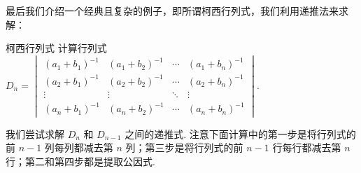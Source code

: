 最后我们介绍一个经典且复杂的例子，即所谓柯西行列式，我们利用递推法来求解：

\begin{example}{柯西行列式}{}
    计算行列式 $D_n=\begin{vmatrix}
            (a_1+b_1)^{-1} & (a_1+b_2)^{-1} & \cdots & (a_1+b_n)^{-1} \\
            (a_2+b_1)^{-1} & (a_2+b_2)^{-1} & \cdots & (a_2+b_n)^{-1} \\
            \vdots         & \vdots         & \ddots & \vdots         \\
            (a_n+b_1)^{-1} & (a_n+b_2)^{-1} & \cdots & (a_n+b_n)^{-1}
        \end{vmatrix}$.
\end{example}

\begin{solution}
    我们尝试求解 $D_n$ 和 $D_{n-1}$ 之间的递推式. 注意下面计算中的第一步是将行列式的前 $n-1$ 列每列都减去第 $n$ 列；第三步是将行列式的前 $n-1$ 行每行都减去第 $n$ 行；第二和第四步都是提取公因式.


\end{solution}
